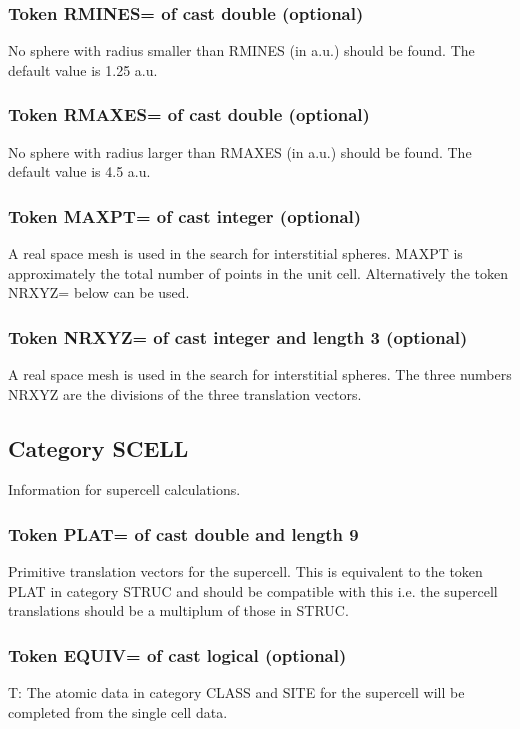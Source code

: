 \documentclass[aps,twocolumn,a4]{revtex4}
\begin{document}
\subsubsection{Token RMINES= of cast double (optional)}
No sphere with radius smaller than RMINES (in a.u.) should be found.
The default value is 1.25 a.u.

\subsubsection{Token RMAXES= of cast double (optional)}
No sphere with radius larger than RMAXES (in a.u.) should be found.
The default value is 4.5 a.u.

\subsubsection{Token MAXPT= of cast integer (optional)}
A real space mesh is used in the search for
interstitial spheres. MAXPT is approximately the total number of points
in the unit cell. Alternatively the token NRXYZ= below can be used.

\subsubsection{Token NRXYZ= of cast integer and length 3 (optional)}
A real space mesh is used in the search for
interstitial spheres. The three numbers NRXYZ are the divisions
of the three translation vectors.

\subsection{Category SCELL}
Information for supercell calculations.

\subsubsection{Token PLAT= of cast double and length 9}
Primitive translation vectors for the supercell. This is equivalent
to the token PLAT in category STRUC and should be compatible with
this i.e. the supercell translations should be a multiplum of those
in STRUC.

\subsubsection{Token EQUIV= of cast logical (optional)}
T: The atomic data in category CLASS and SITE for the supercell will
be completed from the single cell data.
\end{document}
